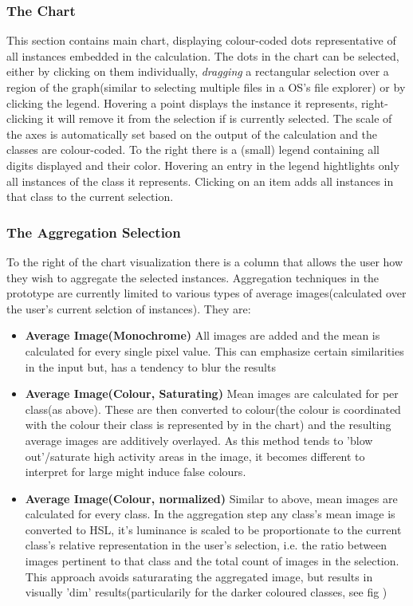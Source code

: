 \documentclass[11pt,a4paper]{article}
\begin{document}
      \subsubsection*{The Chart}
        This section contains main chart, displaying colour-coded dots representative of all instances embedded in the calculation. 
        The dots in the chart can be selected, either by clicking on them individually, \textit{dragging} a rectangular selection over a region of the graph(similar to selecting multiple files in a OS's file explorer) or by clicking the legend. Hovering a point displays the instance it represents, right-clicking it will remove it from the selection if is currently selected. 
        The scale of the axes is automatically set based on the output of the calculation and the classes are colour-coded. To the right there is a (small) legend containing all digits displayed and their color. Hovering an entry in the legend hightlights only all instances of the class it represents. Clicking on an item adds all instances in that class to the current selection.
      \subsubsection*{The Aggregation Selection}
        To the right of the chart visualization there is a column that allows the user how they wish to aggregate the selected instances. Aggregation techniques in the prototype are currently limited to various types of average images(calculated over the user's current selction of instances). They are:\begin{itemize}
            \item \textbf{Average Image(Monochrome)} All images are added and the mean is calculated for every single pixel value. This can emphasize certain similarities in the input but, has a tendency to blur the results
            \item \textbf{Average Image(Colour, Saturating)} Mean images are calculated for per class(as above). These are then converted to colour(the colour is coordinated with the colour their class is represented by in the chart) and the resulting average images are additively overlayed. As this method tends to 'blow out'/saturate high activity areas in the image, it becomes different to interpret for large might induce false colours.
            \item \textbf{Average Image(Colour, normalized)} Similar to above, mean images are calculated for every class. In the aggregation step any class's mean image is converted to HSL, it's luminance is scaled to be proportionate to the current class's relative representation in the user's selection, i.e. the ratio between images pertinent to that class and the total count of images in the selection. This approach avoids saturarating the aggregated image, but results in visually 'dim' results(particularily  for the darker coloured classes, see fig \label{aggregation_techniques})   
        \end{itemize} 
\end{document}
